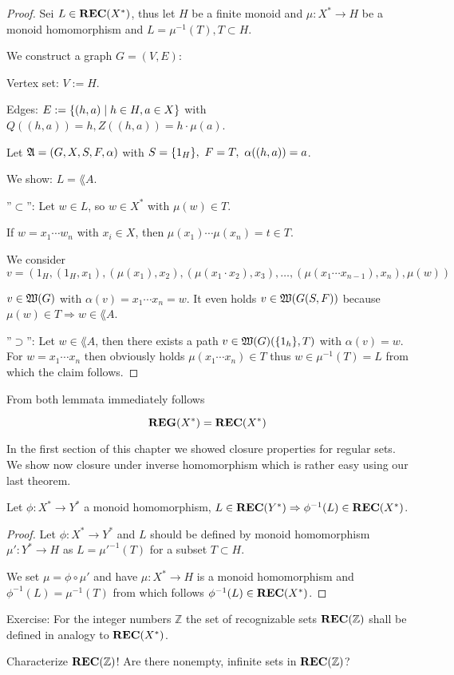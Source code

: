 \begin{proof}
Sei $L \in \mbox{{\bf REC}}(X^*)$, thus let $H$ be a finite monoid and $\mu : X^* \to
H$ be a monoid homomorphism and $L = \mu^{-1}(T), T \subset H$.

We construct a graph $G = (V, E)$:

Vertex set: $V := H$.

Edges: $E := \mbox{$\{(h, a) \mid h \in H, a \in X\}$}$ with $Q((h,a)) = h,
Z((h,a)) = h \cdot \mu(a)$.

\missingfigure

Let $\mbox{$\mathfrak{A}$} = (G, X, S, F, \alpha)$ with $S = \mbox{$\{1_H\}$},\ F = T,\ \alpha((h,
a)) = a$.

We show: $L = \lang{A}$.

''$\subset$'': Let $w \in L$, so $w \in X^*$ with $\mu(w) \in T$.

If $w = x_1 \cdots w_n$ with $x_i \in X$, then $\mu(x_1) \cdots \mu(x_n) = t
\in T$.

We consider \[ v = (1_H, (1_H, x_1), (\mu(x_1), x_2), (\mu(x_1 \cdot x_2),
x_3), \ldots, (\mu(x_1 \cdots x_{n-1}), x_n), \mu(w)) \]

$v \in \mbox{$\mathfrak{W}({G})$}$ with $\alpha(v) = x_1 \cdots x_n = w$. It even holds $v \in
\mbox{$\mathfrak{W}({G(S, F)})$}$ because $\mu(w) \in T \Rightarrow w \in \lang{A}$.

''$\supset$'': Let $w \in \lang{A}$, then there exists a path $v \in
\mbox{$\mathfrak{W}({G})$}(\mbox{$\{1_h\}$}, T)$ with $\alpha(v) = w$. For $w = x_1 \cdots x_n$
then obviously holds $\mu(x_1 \cdots x_n) \in T$ thus $w \in \mu^{-1}(T) = L$ from
which the claim follows.
\end{proof}

From both lemmata immediately follows

\begin{theorem}
\[ \mbox{{\bf REG}}(X^*) = \mbox{{\bf REC}}(X^*) \]
\end{theorem}

In the first section of this chapter we showed closure properties for regular
sets. We show now closure under inverse homomorphism which is rather easy using
our last theorem.

\begin{theorem}
Let $\phi : X^* \to Y^*$ a monoid homomorphism, $L \in \mbox{{\bf REC}}(Y^*) \Rightarrow
\phi^{-1}(L) \in \mbox{{\bf REC}}(X^*)$.
\end{theorem}

\begin{proof}
Let $\phi : X^* \to Y^*$ and $L$ should be defined by monoid homomorphism $\mu'
: Y^* \to H$ as $L = \mu'^{-1}(T)$ for a subset $T \subset H$.

We set $\mu = \phi \circ \mu'$ and have $\mu : X^* \to H$ is a monoid
homomorphism and $\phi^{-1}(L) = \mu^{-1}(T)$ from which follows $\phi^{-1}(L)
\in \mbox{{\bf REC}}(X^*)$.
\end{proof}

Exercise: For the integer numbers $\mathbb{Z}$ the set of recognizable sets
$\mbox{{\bf REC}}(\mathbb{Z})$ shall be defined in analogy to $\mbox{{\bf REC}}(X^*)$.

Characterize $\mbox{{\bf REC}}(\mathbb{Z})$! Are there nonempty, infinite sets in
$\mbox{{\bf REC}}(\mathbb{Z})$?
